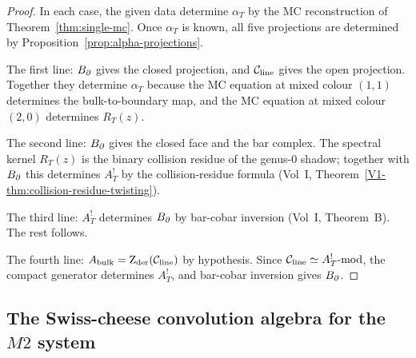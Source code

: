\begin{proof}
In each case, the given data determine $\alpha_T$ by the MC
reconstruction of Theorem~\ref{thm:single-mc}. Once $\alpha_T$
is known, all five projections are determined by
Proposition~\ref{prop:alpha-projections}.

The first line: $B_{\partial}$ gives the closed projection, and
$\mathcal C_{\mathrm{line}}$ gives the open projection. Together they
determine $\alpha_T$ because the MC equation at mixed colour
$(1,1)$ determines the bulk-to-boundary map, and the MC equation
at mixed colour $(2,0)$ determines $R_T(z)$.

The second line: $B_{\partial}$ gives the closed face and the bar
complex. The spectral kernel $R_T(z)$ is the binary collision
residue of the genus-$0$ shadow; together with $B_{\partial}$ this
determines $A^!_T$ by the collision-residue formula
(Vol~I, Theorem~\ref*{V1-thm:collision-residue-twisting}).

The third line: $A^!_T$ determines $B_{\partial}$ by bar-cobar
inversion (Vol~I, Theorem~B). The rest follows.

The fourth line: $A_{\mathrm{bulk}}=\operatorname{Z}_{\mathrm{der}}(\mathcal C_{\mathrm{line}})$ by hypothesis.
Since $\mathcal C_{\mathrm{line}}\simeq A^!_T\text{-mod}$, the compact
generator determines $A^!_T$, and bar-cobar inversion gives $B_{\partial}$.
\end{proof}


\subsection{The Swiss-cheese convolution algebra for the \texorpdfstring{$M2$}{M2} system}

